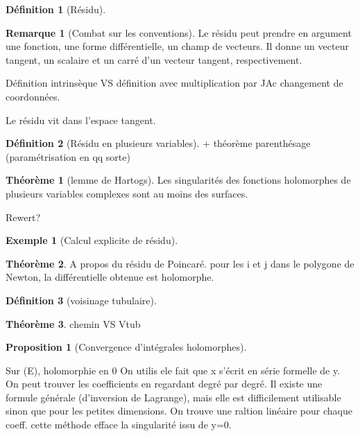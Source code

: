 \documentclass{article}
\theoremstyle{definition} %
\newtheorem{defi}{Définition}
\newtheorem{rmq}{Remarque}
\newtheorem{thm}{Théorème}
\newtheorem{prop}{Proposition}
\newtheorem{ex}{Exemple}
\newcommand{\1}{\mathbb{1}} %
\begin{document}
\begin{defi}[Résidu]

\end{defi}

\begin{rmq}[Combat sur les conventions]

Le résidu peut prendre en argument une fonction, une forme différentielle, un champ de vecteurs. Il donne un vecteur tangent, un scalaire et un carré d'un vecteur tangent, respectivement.

Définition intrinsèque VS définition avec multiplication par JAc changement de coordonnées.

Le résidu vit dans l'espace tangent.
\end{rmq}

\begin{defi}[Résidu en plusieurs variables]
+ théorème parenthésage (paramétrisation en qq sorte)
\end{defi}

\begin{thm}[lemme de Hartogs]
Les singularités des fonctions holomorphes de plusieurs variables complexes sont au moins des surfaces.
\end{thm}

Rewert?

\begin{ex}[Calcul explicite de résidu]

\end{ex}

\begin{thm}
A propos du résidu de Poincaré.
pour les i et j dans le polygone de Newton, la différentielle obtenue est holomorphe.
\end{thm}

\begin{defi}[voisinage tubulaire]

\end{defi}

\begin{thm}
chemin VS Vtub
\end{thm}


\begin{prop}[Convergence d'intégrales holomorphes]

\end{prop}

Sur (E),
holomorphie en 0
On utilis ele fait que x s'écrit en série formelle de y.
On peut trouver les coefficients en regardant degré par degré.
Il existe une formule générale (d'inversion de Lagrange), mais elle est difficilement utilisable sinon que pour les petites dimensions.
On trouve une raltion linéaire pour chaque coeff.
cette méthode efface la singularité issu de y=0.
\end{document}
